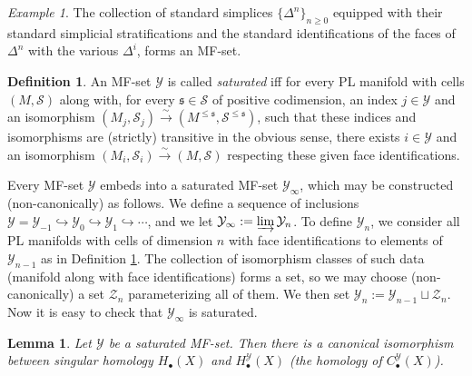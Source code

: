 \documentclass[12pt]{article}
\newtheorem{lemma}[theorem]{Lemma}
\theoremstyle{definition}
\newtheorem{definition}[theorem]{Definition}
\theoremstyle{remark}
\newtheorem{example}[theorem]{Example}
\numberwithin{equation}{subsection}
\newcommand{\s}{\mathfrak s}
\newcommand{\Y}{\mathcal Y}
\newcommand{\Z}{\mathcal Z}
\newcommand{\SSS}{\mathcal S}
\begin{document}
\begin{example}\label{standardsimplicialMFset}
The collection of standard simplices $\{\Delta^n\}_{n\geq 0}$ equipped with their standard simplicial stratifications and the standard identifications of the faces of $\Delta^n$ with the various $\Delta^i$, forms an MF-set.
\end{example}

\begin{definition}\label{saturateddef}
An MF-set $\Y$ is called \emph{saturated} iff for every PL manifold with cells $(M,\SSS)$ along with, for every $\s\in\SSS$ of positive codimension, an index $j\in\Y$ and an isomorphism $(M_j,\SSS_j)\xrightarrow\sim(M^{\leq\s},\SSS^{\leq\s})$, such that these indices and isomorphisms are (strictly) transitive in the obvious sense, there exists $i\in\Y$ and an isomorphism $(M_i,\SSS_i)\xrightarrow\sim(M,\SSS)$ respecting these given face identifications.
\end{definition}

Every MF-set $\Y$ embeds into a saturated MF-set $\Y_\infty$, which may be constructed (non-canonically) as follows.  We define a sequence of inclusions $\Y=\Y_{-1}\hookrightarrow\Y_0\hookrightarrow\Y_1\hookrightarrow\cdots$, and we let $\Y_\infty:=\varinjlim\Y_n$.  To define $\Y_n$, we consider all PL manifolds with cells of dimension $n$ with face identifications to elements of $\Y_{n-1}$ as in Definition \ref{saturateddef}.  The collection of isomorphism classes of such data (manifold along with face identifications) forms a set, so we may choose (non-canonically) a set $\Z_n$ parameterizing all of them.  We then set $\Y_n:=\Y_{n-1}\sqcup\Z_n$.  Now it is easy to check that $\Y_\infty$ is saturated.

\begin{lemma}\label{saturatedcalculatesH}
Let $\Y$ be a saturated MF-set.  Then there is a canonical isomorphism between singular homology $H_\bullet(X)$ and $H^\Y_\bullet(X)$ (the homology of $C^\Y_\bullet(X)$).
\end{lemma}
\end{document}
